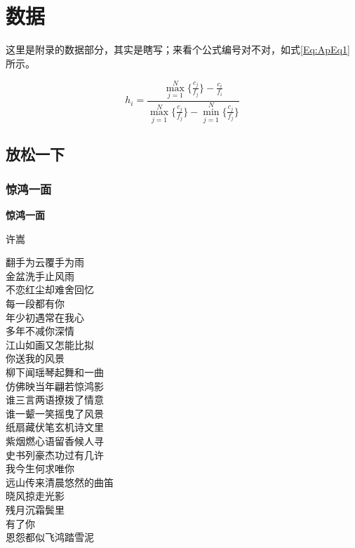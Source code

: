 \chapter{数据}
这里是附录的数据部分，其实是瞎写；来看个公式编号对不对，如式\eqref{Eq:ApEq1}所示。

\begin{equation}\label{Eq:ApEq1}
h_i = \frac{\max_{j=1}^{N}\{\frac{c_j}{f_j}\}-\frac{c_i}{f_i}}{\max_{j=1}^{N}\{\frac{c_j}{f_j}\}-\min_{j=1}^{N}\{\frac{c_j}{f_j}\}}
\end{equation}

\section{放松一下}
\subsection{惊鸿一面}

\begin{center}
\textbf{惊鸿一面}\cite{shanshui}

{\kaishu 许嵩}

\vspace*{1em}
翻手为云\quad 覆手为雨\\
金盆洗手止风雨\\
不恋红尘\quad 却难舍回忆\\
每一段都有你\\

\vspace*{.7em}
年少初遇\quad 常在我心\\
多年不减你深情\\
江山如画\quad 又怎能比拟\\
你送我的风景\\

\vspace*{.7em}
柳下闻瑶琴\quad 起舞和一曲\\
仿佛映当年\quad 翩若惊鸿影\\
谁三言两语\quad 撩拨了情意\\
谁一颦一笑\quad 摇曳了风景\\

\vspace*{.7em}
纸扇藏伏笔\quad 玄机诗文里\\
紫烟燃心语\quad 留香候人寻\\
史书列豪杰\quad 功过有几许\\
我今生何求\quad 唯你\\

\vspace*{.7em}
远山传来清晨悠然的曲笛\\
晓风掠走光影\\
残月沉霜鬓里\\
有了你\\
恩怨都似飞鸿踏雪泥
\end{center}

